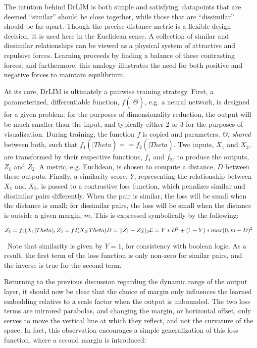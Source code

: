 The intution behind DrLIM is both simple and satisfying: datapoints that are deemed ``similar'' should be close together, while those that are ``dissimilar'' should be far apart.
Though the precise distance metric is a flexible design decision, it is used here in the Euclidean sense.
A collection of similar and dissimilar relationships can be viewed as a physical system of attractive and repulsive forces.
Learning proceeds by finding a balance of these contrasting forces; and furthermore, this analogy illustrates the need for both positive and negative forces to maintain equilibrium.

At its core, DrLIM is ultimately a pairwise training strategy.
First, a parameterized, differentiable function, $f(\dot | \Theta)$, e.g. a neural network, is designed for a given problem; for the purposes of dimensionality reduction, the output will be much smaller than the input, and typically either 2 or 3 for the purposes of visualization.
During training, the function $f$ is copied and parameters, $\Theta$, \emph{shared} between both, such that $f_1(\dot | Theta) == f_2(\dot | Theta)$.
Two inputs, $X_1$ and $X_2$, are transformed by their respective functions, $f_1$ and $f_2$, to produce the outputs, $Z_1$ and $Z_2$.
A metric, e.g. Euclidean, is chosen to compute a distance, $D$ between these outputs.
Finally, a similarity score, $Y$, representing the relationship between $X_1$ and $X_2$, is passed to a contrastive loss function, which penalizes similar and dissimilar pairs differently.
When the pair is similar, the loss will be small when the distance is small; for dissimilar pairs, the loss will be small when the distance is outside a given margin, $m$.
This is expressed symbolically by the following:


\begin{equation}
Z_1 = f_1(X_1 | Theta), Z_2 = f2(X_2 | Theta)\\
D = || Z_1 - Z_2 ||_2\\
\mathcal{L} = Y * D^2 + (1 - Y) * max(0, m - D)^2\\
\end{equation}

\noindent~Note that similarity is given by $Y=1$, for consistency with boolean logic.
As a result, the first term of the loss function is only non-zero for similar pairs, and the inverse is true for the second term.

Returning to the previous discussion regarding the dynamic range of the output layer, it should now be clear that the choice of margin only influences the learned embedding relative to a scale factor when the output is unbounded.
The two loss terms are mirrored parabolas, and changing the margin, or horizontal offset, only serves to move the vertical line at which they reflect, and not the curvature of the space.
In fact, this observation encourages a simple generalization of this loss function, where a second margin is introduced:

